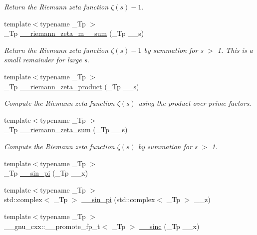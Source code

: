 \begin{DoxyCompactItemize}
\begin{DoxyCompactList}\small\item\em Return the Riemann zeta function $ \zeta(s) - 1 $. \end{DoxyCompactList}\item 
{\footnotesize template$<$typename \+\_\+\+Tp $>$ }\\\+\_\+\+Tp \hyperlink{namespacestd_1_1____detail_a3985751e758b45d726ea8dec0450ca1e}{\+\_\+\+\_\+riemann\+\_\+zeta\+\_\+m\+\_\+\_\+sum} (\+\_\+\+Tp \+\_\+\+\_\+s)
\begin{DoxyCompactList}\small\item\em Return the Riemann zeta function $ \zeta(s) - 1 $ by summation for  s $>$ 1. This is a small remainder for large s. \end{DoxyCompactList}\item 
{\footnotesize template$<$typename \+\_\+\+Tp $>$ }\\\+\_\+\+Tp \hyperlink{namespacestd_1_1____detail_a917935f42a21af90b78a19ea81349129}{\+\_\+\+\_\+riemann\+\_\+zeta\+\_\+product} (\+\_\+\+Tp \+\_\+\+\_\+s)
\begin{DoxyCompactList}\small\item\em Compute the Riemann zeta function $ \zeta(s) $ using the product over prime factors. \end{DoxyCompactList}\item 
{\footnotesize template$<$typename \+\_\+\+Tp $>$ }\\\+\_\+\+Tp \hyperlink{namespacestd_1_1____detail_a417dc216465f02bb7ef055fa0e4e1f0b}{\+\_\+\+\_\+riemann\+\_\+zeta\+\_\+sum} (\+\_\+\+Tp \+\_\+\+\_\+s)
\begin{DoxyCompactList}\small\item\em Compute the Riemann zeta function $ \zeta(s) $ by summation for s $>$ 1. \end{DoxyCompactList}\item 
{\footnotesize template$<$typename \+\_\+\+Tp $>$ }\\\+\_\+\+Tp \hyperlink{namespacestd_1_1____detail_a763249defff6377195818c2fc6e7bca2}{\+\_\+\+\_\+sin\+\_\+pi} (\+\_\+\+Tp \+\_\+\+\_\+x)
\item 
{\footnotesize template$<$typename \+\_\+\+Tp $>$ }\\std\+::complex$<$ \+\_\+\+Tp $>$ \hyperlink{namespacestd_1_1____detail_a5f26e85b3d646e5c69be173baebd4185}{\+\_\+\+\_\+sin\+\_\+pi} (std\+::complex$<$ \+\_\+\+Tp $>$ \+\_\+\+\_\+z)
\item 
{\footnotesize template$<$typename \+\_\+\+Tp $>$ }\\\+\_\+\+\_\+gnu\+\_\+cxx\+::\+\_\+\+\_\+promote\+\_\+fp\+\_\+t$<$ \+\_\+\+Tp $>$ \hyperlink{namespacestd_1_1____detail_aa7bdd4dd998288441b84ca2e142a4a04}{\+\_\+\+\_\+sinc} (\+\_\+\+Tp \+\_\+\+\_\+x)

\end{DoxyCompactItemize}

